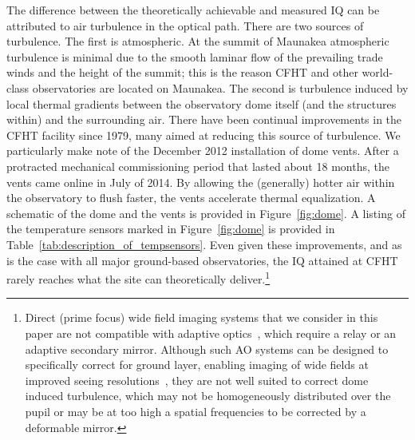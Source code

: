 The difference between the theoretically achievable and measured IQ can be attributed to air turbulence in the optical path.  There are two sources of turbulence.  The first is atmospheric.  At the summit of Maunakea atmospheric turbulence is minimal due to the smooth laminar flow of the prevailing trade winds and the height of the summit; this is the reason CFHT and other world-class observatories are located on Maunakea.  The second is turbulence induced by local thermal gradients between the observatory dome itself (and the structures within) and the surrounding air.  There have been continual improvements in the CFHT facility since 1979, many aimed at reducing this source of turbulence. We particularly make note of the December 2012 installation of dome vents.  After a protracted mechanical commissioning period that lasted about 18 months, the vents  came online in July of 2014. By allowing the (generally) hotter air within the observatory to flush faster, the vents accelerate thermal equalization. A schematic of the dome and the vents is provided in Figure~\ref{fig:dome}. A listing of the temperature sensors marked in Figure~\ref{fig:dome} is provided in Table~\ref{tab:description_of_tempsensors}.
Even given these improvements, and as is the case with all major ground-based observatories, the IQ attained at CFHT rarely reaches what the site can theoretically deliver.\footnote{Direct (prime focus) wide field imaging systems that we consider in this paper are not compatible with adaptive optics~\citep{adaptiveoptics0,adaptiveoptics1}, which require a relay or an adaptive secondary mirror. Although such AO systems can be designed to specifically correct for ground layer, enabling imaging of wide fields at improved seeing resolutions~\citep{imaka}, they are not well suited to correct dome induced turbulence, which may not be homogeneously distributed over the pupil or may be at too high a spatial frequencies to be corrected by a deformable mirror.}



